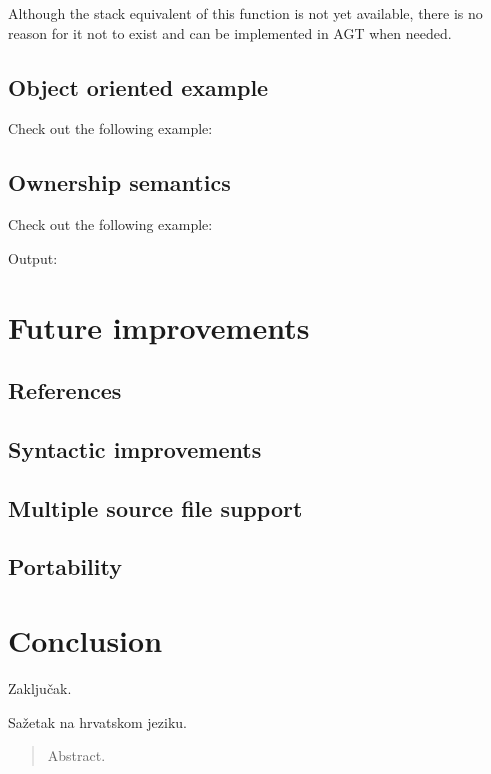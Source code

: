 \documentclass[times, utf8, diplomski]{fer}
\theoremstyle{definition}
\newcommand{\textcode}[3]{
    
}
\begin{document}
Although the stack equivalent of this function is not yet available, there
is no reason for it not to exist and can be implemented in AGT when needed.

\section{Object oriented example}

Check out the following example:
\textcode{\resdir/programs/string_mgmt.agt}{}{a}

\section{Ownership semantics}

Check out the following example:
\textcode{\resdir/programs/shared_pointer.agt}{}{a}

Output:
\textcode{\resdir/programs/shared_pointer.out}{}{a}


\chapter{Future improvements}\label{chap:improv}

\section{References}

\section{Syntactic improvements}

\section{Multiple source file support}

\section{Portability}





\chapter{Conclusion}\label{chap:concl}
Zaključak.




\begin{sazetak}
Sažetak na hrvatskom jeziku.

\end{sazetak}

\begin{abstract}
Abstract.

\end{abstract}
\end{document}

